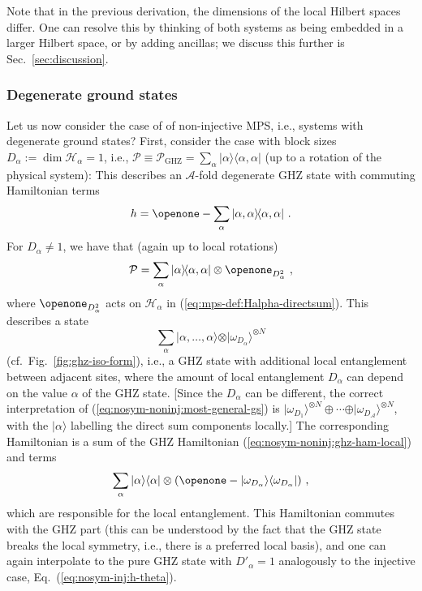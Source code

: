 \documentclass[twocolumn,superscriptaddress,prb,linenumbers]{revtex4-1}
\newcommand{\ket}[1]{\vert#1\rangle}
\newcommand{\bra}[1]{\langle#1\vert}
\newcommand{\mc}[1]{\mathcal{#1}}
\newcommand{\sss}[1]{\subsubsection{#1}}
\begin{document}
Note that in the previous derivation, the dimensions of the local Hilbert
spaces differ. One can resolve this by thinking of both systems as being
embedded in a larger Hilbert space, or by adding ancillas; we discuss
this further is Sec.~\ref{sec:discussion}.

\sss{Degenerate ground states}

Let us now consider the case of of non-injective MPS, i.e., systems with
degenerate ground states? First, consider the case
with block sizes $D_\alpha:=\dim \mc H_\alpha=1$, i.e., $\mc P\equiv\mc
    P_\mathrm{GHZ}=\sum_\alpha \ket{\alpha}\!\bra{\alpha,\alpha}$ (up to
a rotation of the physical system): This
describes an $\mc A$-fold degenerate GHZ state with commuting Hamiltonian
terms
\begin{equation}
    \label{eq:nosym-noninj:ghz-ham-local}
    h=\openone-\sum_\alpha\ket{\alpha,\alpha}\!\bra{\alpha,\alpha}\ .
\end{equation}
For $D_\alpha\ne1$, we
have that (again up to local rotations)
\[
    \mc P=\sum_\alpha\ket{\alpha}\!\bra{\alpha,\alpha}\otimes
    \openone_{D_\alpha^2}\ ,
\]
where $\openone_{D_\alpha^2}$ acts on $\mc H_\alpha$ in
(\ref{eq:mps-def:Halpha-directsum}).  This describes a state
\begin{equation}
    \label{eq:nosym-noninj:most-general-gs}
    \sum_\alpha
    \ket{\alpha,\dots,\alpha}\otimes\ket{\omega_{D_\alpha}}^{\otimes N}
\end{equation}
(cf.~Fig.~\ref{fig:ghz-iso-form}), i.e., a GHZ state with additional local
entanglement between adjacent sites, where the amount of local
entanglement $D_\alpha$ can depend on the value $\alpha$ of the GHZ state.
    [Since the $D_\alpha$ can be different, the correct interpretation of
        (\ref{eq:nosym-noninj:most-general-gs})
        is $\ket{\omega_{D_1}}^{\otimes N}\oplus\cdots\oplus
            \ket{\omega_{D_{\mc A}}}^{\otimes N}$, with the $\ket{\alpha}$ labelling
        the direct sum components locally.] The corresponding Hamiltonian is a
sum of the GHZ Hamiltonian (\ref{eq:nosym-noninj:ghz-ham-local})
and terms
\[
    \sum_\alpha\ket\alpha\bra\alpha\otimes
    (\openone-\vert\omega_{D_\alpha}\rangle\langle\omega_{D_\alpha}\vert)\ ,
\]
which are responsible for the local entanglement. This Hamiltonian
commutes with the GHZ part (this can be understood by the fact that the
GHZ state breaks the local symmetry, i.e., there is a preferred local
basis), and one can again interpolate
to the pure GHZ state with $D'_\alpha=1$ analogously to the injective
case, Eq.~(\ref{eq:nosym-inj:h-theta}).
\end{document}
